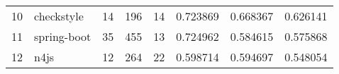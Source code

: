 \begin{tabular}{llrrrrrr}
10 &         checkstyle &                         14 &                        196 &                                 14 &                    0.723869 &                 0.668367 &             0.626141 \\
11 &        spring-boot &                         35 &                        455 &                                 13 &                    0.724962 &                 0.584615 &             0.575868 \\
12 &               n4js &                         12 &                        264 &                                 22 &                    0.598714 &                 0.594697 &             0.548054 \\
\bottomrule
\end{tabular}
